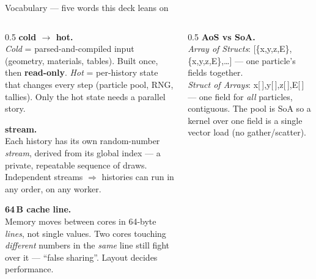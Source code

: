 \documentclass[aspectratio=169,10pt]{beamer}
\newcommand{\code}[1]{{\ttfamily\footnotesize #1}}
\begin{document}
\begin{frame}{Vocabulary — five words this deck leans on}
  \small
  \begin{columns}[T]
    \begin{column}{0.5\textwidth}
      \textbf{cold $\to$ hot.}\\
      \textcolor{oshGreen}{\emph{Cold}} = parsed-and-compiled input
      (geometry, materials, tables). Built once, then \textbf{read-only}.
      \textcolor{oshRed}{\emph{Hot}} = per-history state that changes every
      step (particle pool, RNG, tallies). Only the hot state needs a parallel
      story.
      \medskip

      \textbf{stream.}\\
      Each history has its own random-number \emph{stream}, derived from its
      global index — a private, repeatable sequence of draws. Independent
      streams $\Rightarrow$ histories can run in any order, on any worker.
      \medskip

      \textbf{64\,B cache line.}\\
      Memory moves between cores in 64-byte \emph{lines}, not single values.
      Two cores touching \emph{different} numbers in the \emph{same} line still
      fight over it — ``false sharing''. Layout decides performance.
    \end{column}
    \begin{column}{0.5\textwidth}
      \textbf{AoS vs SoA.}\\
      \emph{Array of Structs}: \code{[\{x,y,z,E\},\{x,y,z,E\},\dots]} —
      one particle's fields together.\\
      \emph{Struct of Arrays}: \code{x[\,],y[\,],z[\,],E[\,]} —
      one field for \emph{all} particles, contiguous. The pool is SoA so a
      kernel over one field is a single vector load (no gather/scatter).
      \medskip

    \end{column}
  \end{columns}
\end{frame}
\end{document}
